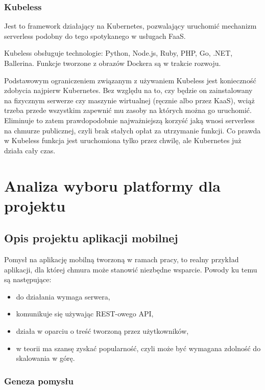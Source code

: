 \documentclass[12pt,a4paper,twoside,titlepage,openright]{book}
\begin{document}
\subsection{Kubeless}

Jest to framework działający na Kubernetes, pozwalający uruchomić mechanizm serverless podobny do tego spotykanego w usługach FaaS. \cite{distributedSystems} 

Kubeless obsługuje technologie: Python, Node.js, Ruby, PHP, Go, .NET, Ballerina. Funkcje tworzone z obrazów Dockera są w trakcie rozwoju.

Podstawowym ograniczeniem związanym z używaniem Kubeless jest konieczność zdobycia najpierw Kubernetes. Bez względu na to, czy będzie on zainstalowany na fizycznym serwerze czy maszynie wirtualnej (ręcznie albo przez KaaS), wciąż trzeba przede wszystkim zapewnić mu zasoby na których można go uruchomić. Eliminuje to zatem prawdopodobnie najważniejszą korzyść jaką wnosi serverless na chmurze publicznej, czyli brak stałych opłat za utrzymanie funkcji. Co prawda w Kubeless funkcja jest uruchomiona tylko przez chwilę, ale Kubernetes już działa cały czas.


\chapter{Analiza wyboru platformy dla projektu}

\section{Opis projektu aplikacji mobilnej}

Pomysł na aplikację mobilną tworzoną w ramach pracy, to realny przykład aplikacji, dla której chmura może stanowić niezbędne wsparcie. Powody ku temu są następujące:
\begin{itemize}
\item do działania wymaga serwera,
\item komunikuje się używając REST-owego API,
\item działa w oparciu o treść tworzoną przez użytkowników,
\item w teorii ma szansę zyskać popularność, czyli może być wymagana zdolność do skalowania w górę.
\end{itemize}

\subsection{Geneza pomysłu}\label{section:genezaPomyslu}
\end{document}
